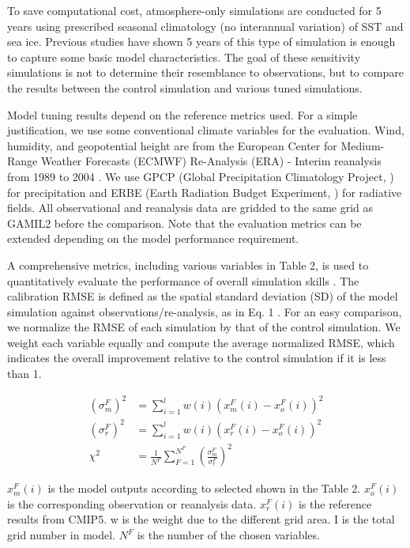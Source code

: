 \documentclass[gmd, manuscript]{copernicus}
\begin{document}
To save computational cost, atmosphere-only simulations are conducted for 5 years using prescribed seasonal climatology (no interannual variation) of SST and sea ice. Previous studies have shown 5 years of this type of simulation is enough to capture some basic model characteristics. The goal of these sensitivity simulations is not to determine their resemblance to observations, but to compare the results between the control simulation and various tuned simulations.

Model tuning results depend on the reference metrics used. For a simple justification, we use some conventional climate variables for the evaluation. Wind, humidity, and geopotential height are from the European Center for Medium-Range Weather Forecasts (ECMWF) Re-Analysis (ERA) - Interim reanalysis from 1989 to 2004 \citep{simmons2007era}. We use GPCP (Global Precipitation Climatology Project, \citep{adler2003version}) for precipitation and ERBE (Earth Radiation Budget Experiment, \citep{barkstrom1984earth}) for radiative fields. All observational and reanalysis data are gridded to the same grid as GAMIL2 before the comparison. Note that the evaluation metrics can be extended depending on the model performance requirement. 


A comprehensive metrics, including various variables in Table 2, is used to quantitatively evaluate the performance of overall simulation skills \citep{murphy2004quantification, gleckler2008performance, reichler2008well}. The calibration RMSE is defined as the spatial standard deviation (SD) of the model simulation against observations/re-analysis, as in Eq. 1 \citep{taylor2001summarizing,yang2013uncertainty}. For an easy comparison, we normalize the RMSE of each simulation by that of the control simulation. We weight each variable equally and compute the average normalized RMSE, which indicates the overall improvement relative to the control simulation if it is less than 1. 


\begin{align}
(\sigma_m^F)^2 &= \sum_{i=1}^l w(i)(x_m^F(i) - x_o^F(i))^2 \\
(\sigma_r^F)^2 &= \sum_{i=1}^l w(i)(x_r^F(i) - x_o^F(i))^2 \\
\chi^2 &= \frac{1}{N^F}\sum_{F=1}^{N^F} (\frac{\sigma_m^F}{\sigma_r^F})^2
\end{align}

$x_m^F(i)$ is the model outputs according to selected shown in the Table 2. $x_o^F(i)$ is the 
corresponding observation or reanalysis data. $x_r^F(i)$ is the reference results from CMIP5. w is 
the weight due to the different grid area. I is the total grid number in model. $N^F$ is the 
number of the chosen variables.
\end{document}
